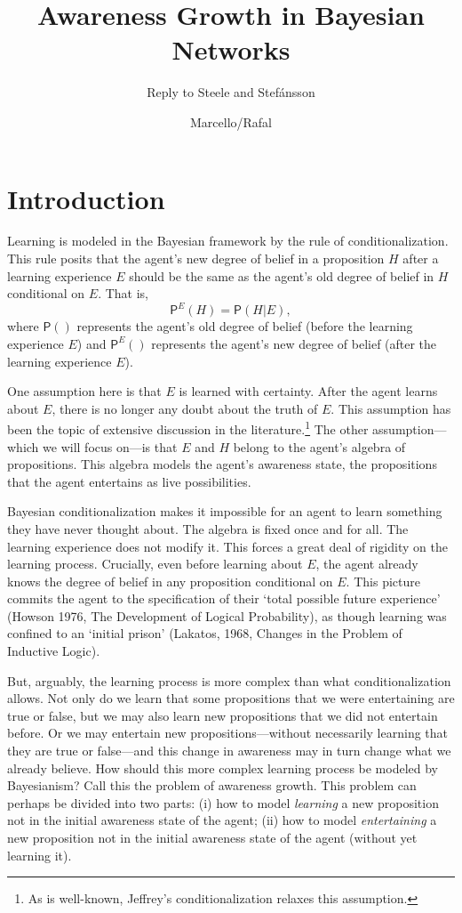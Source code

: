 \documentclass[
  11pt,
  dvipsnames,enabledeprecatedfontcommands]{scrartcl}
\title{Awareness Growth in Bayesian Networks}
\subtitle{Reply to Steele and Stefánsson}
\author{Marcello/Rafal}
\date{}
\newcommand{\pr}[1]{\ensuremath{\mathsf{P}(#1)}}
\newcommand{\ppr}[2]{\ensuremath{\mathsf{P}^{#1}(#2)}}
\begin{document}
\maketitle

\hypertarget{introduction}{%
\section{Introduction}\label{introduction}}

Learning is modeled in the Bayesian framework by the rule of
conditionalization. This rule posits that the agent's new degree of
belief in a proposition \(H\) after a learning experience \(E\) should
be the same as the agent's old degree of belief in \(H\) conditional on
\(E\). That is, \[\ppr{E}{H}=\pr{H \vert E},\] where \(\pr{}\)
represents the agent's old degree of belief (before the learning
experience \(E\)) and \(\ppr{E}{}\) represents the agent's new degree of
belief (after the learning experience \(E\)).

One assumption here is that \(E\) is learned with certainty. After the
agent learns about \(E\), there is no longer any doubt about the truth
of \(E\). This assumption has been the topic of extensive discussion in
the literature.\footnote{As is well-known, Jeffrey's conditionalization
  relaxes this assumption.} The other assumption---which we will focus
on---is that \(E\) and \(H\) belong to the agent's algebra of
propositions. This algebra models the agent's awareness state, the
propositions that the agent entertains as live possibilities.

Bayesian conditionalization makes it impossible for an agent to learn
something they have never thought about. The algebra is fixed once and
for all. The learning experience does not modify it. This forces a great
deal of rigidity on the learning process. Crucially, even before
learning about \(E\), the agent already knows the degree of belief in
any proposition conditional on \(E\). This picture commits the agent to
the specification of their `total possible future experience' (Howson
1976, The Development of Logical Probability), as though learning was
confined to an `initial prison' (Lakatos, 1968, Changes in the Problem
of Inductive Logic).

But, arguably, the learning process is more complex than what
conditionalization allows. Not only do we learn that some propositions
that we were entertaining are true or false, but we may also learn new
propositions that we did not entertain before. Or we may entertain new
propositions---without necessarily learning that they are true or
false---and this change in awareness may in turn change what we already
believe. How should this more complex learning process be modeled by
Bayesianism? Call this the problem of awareness growth. This problem can
perhaps be divided into two parts: (i) how to model \textit{learning} a
new proposition not in the initial awareness state of the agent; (ii)
how to model \textit{entertaining} a new proposition not in the initial
awareness state of the agent (without yet learning it).
\end{document}
